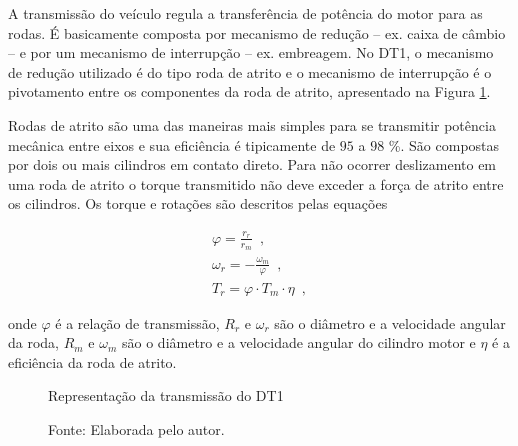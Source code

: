 A transmissão do veículo regula a transferência de potência do motor para as rodas. É basicamente composta por mecanismo de
redução -- ex. caixa de câmbio -- e por um mecanismo de interrupção -- ex. embreagem\cite{book:Modern_Electric_Vehicles}.
No DT1, o mecanismo de redução utilizado é do tipo roda de atrito e o mecanismo de interrupção é o pivotamento entre os componentes da roda de atrito, apresentado na Figura \ref{dig:Trasmissao}.

Rodas de atrito são uma das maneiras mais simples para se transmitir potência mecânica entre eixos e sua eficiência é tipicamente de $95$ a $98$ {\%}. São compostas por dois ou mais cilindros em contato direto.  
Para não ocorrer deslizamento em uma roda de atrito o torque transmitido não deve exceder a força de atrito entre os cilindros. Os torque e rotações são descritos pelas equações 

\begin{subequations}
	\label{eq:Transmissao}
	\begin{align}
		\varphi = \frac{r_{r}}{r_{m}}\enspace, \label{eq:Transmissao_1} \\
		\omega_{r} = -\frac{\omega_{m}}{\varphi}\enspace, \label{eq:Transmissao_2}  \\
		T_{r} =\varphi \cdot T_{m} \cdot \eta\enspace, \label{eq:Transmissao_3}
	\end{align}
\end{subequations}

onde $\varphi$ é a relação de transmissão, $R_{r}$ e $\omega_{r}$ são o diâmetro e a velocidade angular da roda, 
$R_{m}$ e $\omega_{m}$ são o diâmetro e a velocidade angular do cilindro motor e $\eta$ é a eficiência da roda de atrito.\cite{book:Niemann1971,book:Norton2010}

\begin{figure}[h]
	\centering
	\caption{Representação da transmissão do DT1}
	\label{dig:Trasmissao}
	\caption*{\footnotesize Fonte: Elaborada pelo autor.}
\end{figure}

